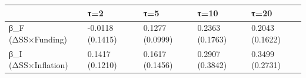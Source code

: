 \begin{tabular}{lllll}
\toprule
 & τ=2 & τ=5 & τ=10 & τ=20 \\
\midrule
β_F (ΔSS×Funding) & -0.0118
(0.1415) & 0.1277
(0.0999) & 0.2363
(0.1763) & 0.2043
(0.1622) \\
β_I (ΔSS×Inflation) & 0.1417
(0.1210) & 0.1617
(0.1456) & 0.2907
(0.3842) & 0.3499
(0.2731) \\
\bottomrule
\end{tabular}

